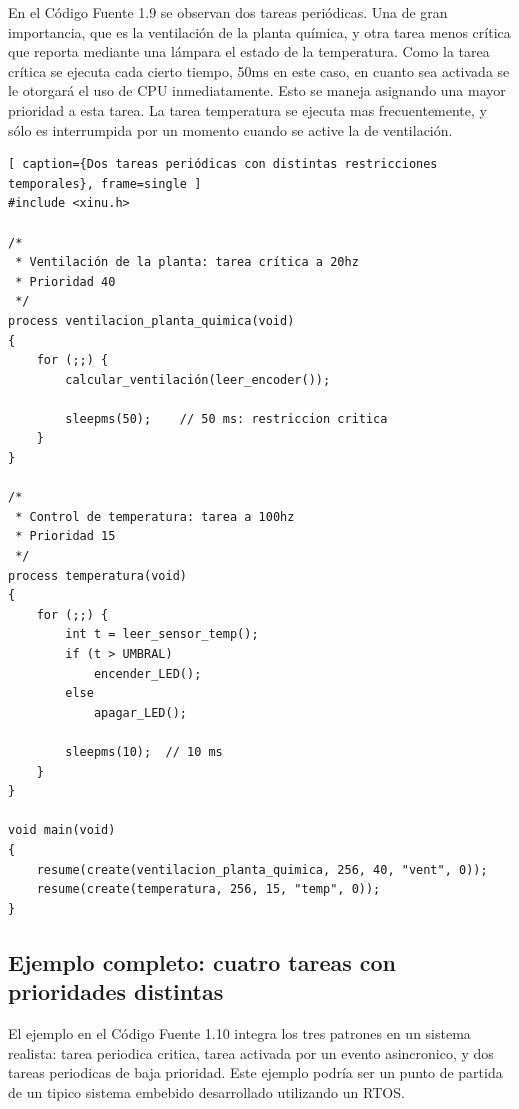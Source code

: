 \documentclass[output=paper, 
colorlinks,
citecolor=brown,
newtxmath
]{langscibook}
\begin{document}
En el Código Fuente 1.9 se observan dos tareas periódicas.
Una de gran importancia, que es la ventilación de la planta química, y 
otra tarea menos crítica que reporta mediante una lámpara el estado
de la temperatura. Como la tarea crítica se ejecuta cada cierto tiempo,
50ms en este caso, en cuanto sea activada 
se le otorgará el uso de CPU inmediatamente. Esto se maneja 
asignando una mayor prioridad a esta tarea. La tarea temperatura
se ejecuta mas frecuentemente, y sólo es interrumpida por un momento
cuando se active la de ventilación.

\begin{lstlisting}[ caption={Dos tareas periódicas con distintas restricciones temporales}, frame=single ]
#include <xinu.h>

/*
 * Ventilación de la planta: tarea crítica a 20hz
 * Prioridad 40
 */
process ventilacion_planta_quimica(void)
{
    for (;;) {
        calcular_ventilación(leer_encoder());

        sleepms(50);    // 50 ms: restriccion critica
    }
}

/*
 * Control de temperatura: tarea a 100hz
 * Prioridad 15
 */
process temperatura(void)
{
    for (;;) {
        int t = leer_sensor_temp();
        if (t > UMBRAL) 
            encender_LED();
        else             
            apagar_LED();

        sleepms(10);  // 10 ms
    }
}

void main(void) 
{
    resume(create(ventilacion_planta_quimica, 256, 40, "vent", 0));
    resume(create(temperatura, 256, 15, "temp", 0));
}
\end{lstlisting}

\subsection{ Ejemplo completo: cuatro tareas con prioridades distintas}
El ejemplo en el Código Fuente 1.10 integra los tres patrones en un sistema realista: tarea periodica critica, tarea activada por un evento asincronico, y dos tareas periodicas de baja prioridad. Este ejemplo podría ser un punto de partida de
un tipico sistema embebido desarrollado utilizando un RTOS. 
\end{document}
